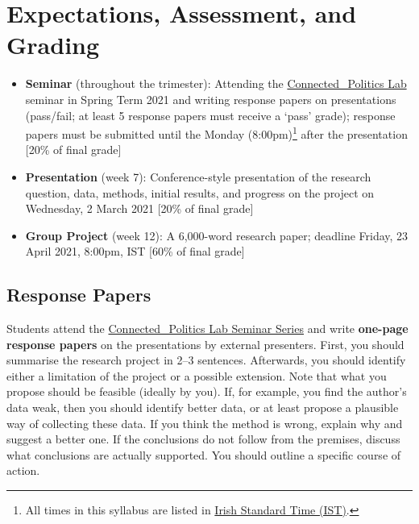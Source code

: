 \documentclass[abstract=on,parskip=full,headings=standardclasses,fontsize=11pt,paper=a4]{scrartcl}
\begin{document}
\section*{Expectations, Assessment, and Grading}


\begin{itemize}
\item \textbf{Seminar} (throughout the trimester): Attending the \href{https://www.ucd.ie/connected_politics/events/}{Connected\_Politics Lab} seminar in Spring Term 2021 and writing response papers on presentations (pass/fail; at least 5 response papers must receive a `pass'  grade); response papers must be submitted until the Monday (8:00pm)\footnote{All times in this syllabus are listed in \href{https://www.timeanddate.com/time/zones/ist-ireland}{Irish Standard Time (IST)}.} after  the presentation [20\% of final grade]
\item \textbf{Presentation} (week 7):  Conference-style presentation of the research question, data, methods, initial results, and progress on the project  on Wednesday, 2 March 2021 [20\% of final grade]
\item \textbf{Group Project} (week 12): A 6,000-word research paper; deadline Friday, 23 April 2021, 8:00pm, IST	  [60\% of final grade]
\end{itemize}





\subsection*{Response Papers}


Students attend the \href{https://www.ucd.ie/connected_politics/events/}{Connected\_Politics Lab Seminar Series} and write \textbf{one-page response papers} on the presentations by external presenters. First, you should summarise the research project in 2--3 sentences. Afterwards,  you should identify either a limitation of the project or a possible extension. Note that what you propose should be feasible (ideally by you). If, for example, you find the author's data weak, then you should identify better data, or at least propose a plausible way of collecting these data. If you think the method is wrong, explain why and suggest a better one. If the conclusions do not follow from the premises, discuss what conclusions are actually supported.  You should outline a specific course of action.  
 
\end{document}
